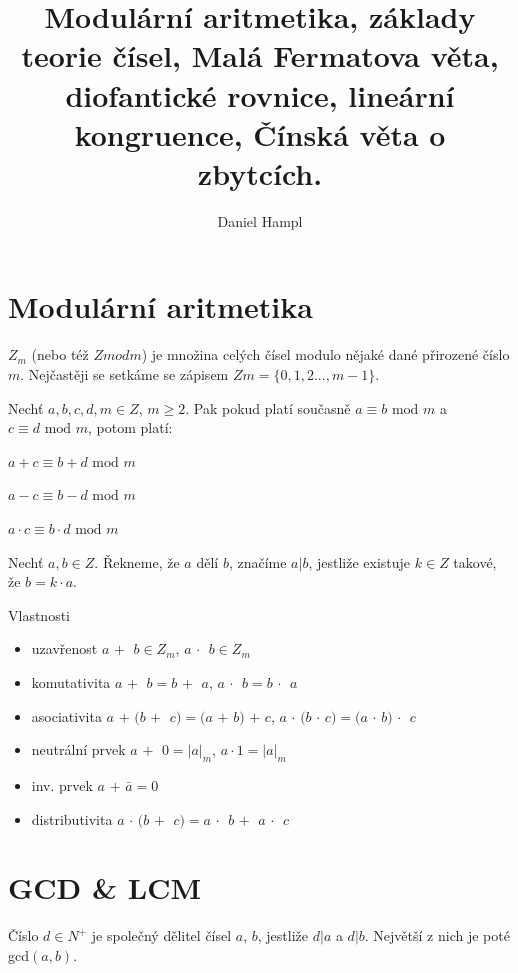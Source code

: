 \documentclass{szzclass}
\title{Modulární aritmetika, základy teorie čísel, Malá   Fermatova věta, diofantické rovnice, lineární kongruence, Čínská věta o   zbytcích.}
\author{Daniel Hampl}
\begin{document}
\maketitle

\tableofcontents
\newpage

\section{Modulární aritmetika}
$Z_m$ (nebo též $Z mod m$) je množina celých čísel modulo nějaké dané přirozené číslo $m$. Nejčastěji se
setkáme se zápisem $Zm = \{0, 1, 2 . . . , m - 1\}$.

Nechť $a, b, c, d, m \in Z$, $m \geq 2$. Pak pokud platí současně $a \equiv b \text{ mod } m$ a $c \equiv d \text{ mod } m$, potom platí:

\begin{center}
$a + c \equiv b + d \text{ mod } m$

$a - c \equiv b - d \text{ mod } m$

$a \cdot c \equiv b \cdot d \text{ mod } m$
\end{center}

Nechť $a, b \in Z$. Řekneme, že $a$ dělí $b$, značíme $a|b$, jestliže
existuje $k \in Z$ takové, že $b = k \cdot a$.

Vlastnosti
\begin{itemize}
    \item uzavřenost $a$ \textcircled{$+$} $b \in Z_m$, $a$ \textcircled{$\cdot$} $b \in Z_m$
    \item komutativita $a$ \textcircled{$+$} $b = b$ \textcircled{$+$} $a$, $a$ \textcircled{$\cdot$} $b = b$ \textcircled{$\cdot$} $a$
    \item asociativita $a$ \textcircled{$+$} $(b$ \textcircled{$+$} $c) = (a$ \textcircled{$+$} $b)$ \textcircled{$+$} $c$,
    $a$ \textcircled{$\cdot$} $(b$ \textcircled{$\cdot$} $c) = (a$ \textcircled{$\cdot$} $b)$ \textcircled{$\cdot$} $c$
    \item neutrální prvek $a$ \textcircled{$+$} $0 = |a|_m$, $a \cdot 1 = |a|_m$
    \item inv. prvek $a$ \textcircled{$+$} $\bar{a} = 0$
    \item distributivita $a$ \textcircled{$\cdot$} $(b$ \textcircled{$+$} $c) = a$ \textcircled{$\cdot$} $b$ \textcircled{$+$} $a$ \textcircled{$\cdot$} $c$
\end{itemize}

\newpage

\section{GCD \& LCM}
Číslo $d \in N^+$ je společný dělitel čísel $a$, $b$, jestliže $d|a$ a $d|b$. Největší z nich je poté gcd$(a,b)$.
\end{document}
